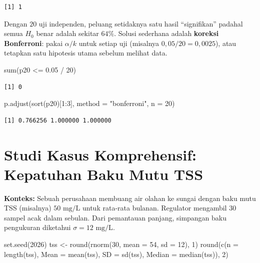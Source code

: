\documentclass[
  indonesian,
  letterpaper,
]{book}
\newenvironment{Shaded}{\begin{snugshade}}{\end{snugshade}}
\newcommand{\AttributeTok}[1]{\textcolor[rgb]{0.40,0.45,0.13}{#1}}
\newcommand{\DecValTok}[1]{\textcolor[rgb]{0.68,0.00,0.00}{#1}}
\newcommand{\FloatTok}[1]{\textcolor[rgb]{0.68,0.00,0.00}{#1}}
\newcommand{\FunctionTok}[1]{\textcolor[rgb]{0.28,0.35,0.67}{#1}}
\newcommand{\NormalTok}[1]{\textcolor[rgb]{0.00,0.23,0.31}{#1}}
\newcommand{\OtherTok}[1]{\textcolor[rgb]{0.00,0.23,0.31}{#1}}
\newcommand{\SpecialCharTok}[1]{\textcolor[rgb]{0.37,0.37,0.37}{#1}}
\newcommand{\StringTok}[1]{\textcolor[rgb]{0.13,0.47,0.30}{#1}}
\begin{document}
\begin{verbatim}
[1] 1
\end{verbatim}

Dengan \(20\) uji independen, peluang setidaknya satu hasil
``signifikan'' padahal semua \(H_0\) benar adalah sekitar \(64\%\).
Solusi sederhana adalah \textbf{koreksi Bonferroni}: pakai
\(\alpha / k\) untuk setiap uji (misalnya \(0{,}05 / 20 = 0{,}0025\)),
atau tetapkan satu hipotesis utama sebelum melihat data.

\begin{Shaded}
\begin{Highlighting}[]
\FunctionTok{sum}\NormalTok{(p20 }\SpecialCharTok{\textless{}=} \FloatTok{0.05} \SpecialCharTok{/} \DecValTok{20}\NormalTok{)}
\end{Highlighting}
\end{Shaded}

\begin{verbatim}
[1] 0
\end{verbatim}

\begin{Shaded}
\begin{Highlighting}[]
\FunctionTok{p.adjust}\NormalTok{(}\FunctionTok{sort}\NormalTok{(p20)[}\DecValTok{1}\SpecialCharTok{:}\DecValTok{3}\NormalTok{], }\AttributeTok{method =} \StringTok{"bonferroni"}\NormalTok{, }\AttributeTok{n =} \DecValTok{20}\NormalTok{)}
\end{Highlighting}
\end{Shaded}

\begin{verbatim}
[1] 0.766256 1.000000 1.000000
\end{verbatim}

\section{Studi Kasus Komprehensif: Kepatuhan Baku Mutu
TSS}\label{studi-kasus-komprehensif-kepatuhan-baku-mutu-tss}

\textbf{Konteks:} Sebuah perusahaan membuang air olahan ke sungai dengan
baku mutu TSS (misalnya) \(50\text{ mg/L}\) untuk rata-rata bulanan.
Regulator mengambil \(30\) sampel acak dalam sebulan. Dari pemantauan
panjang, simpangan baku pengukuran diketahui
\(\sigma = 12\text{ mg/L}\).

\begin{Shaded}
\begin{Highlighting}[]
\FunctionTok{set.seed}\NormalTok{(}\DecValTok{2026}\NormalTok{)}
\NormalTok{tss }\OtherTok{\textless{}{-}} \FunctionTok{round}\NormalTok{(}\FunctionTok{rnorm}\NormalTok{(}\DecValTok{30}\NormalTok{, }\AttributeTok{mean =} \DecValTok{54}\NormalTok{, }\AttributeTok{sd =} \DecValTok{12}\NormalTok{), }\DecValTok{1}\NormalTok{)}
\FunctionTok{round}\NormalTok{(}\FunctionTok{c}\NormalTok{(}\AttributeTok{n =} \FunctionTok{length}\NormalTok{(tss), }\AttributeTok{Mean =} \FunctionTok{mean}\NormalTok{(tss), }\AttributeTok{SD =} \FunctionTok{sd}\NormalTok{(tss), }\AttributeTok{Median =} \FunctionTok{median}\NormalTok{(tss)), }\DecValTok{2}\NormalTok{)}
\end{Highlighting}
\end{Shaded}
\end{document}
